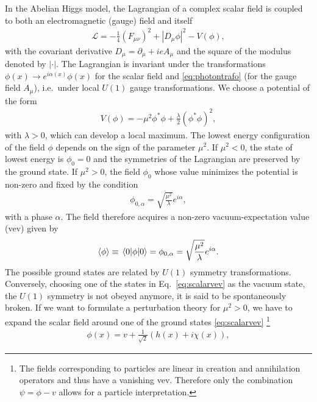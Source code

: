 In the Abelian Higgs model, the Lagrangian of a complex scalar field is coupled to both an electromagnetic (gauge) field and itself 
\begin{align}\label{eq:sclag}
  \mathcal{L} = -\frac{1}{4}(F_{\mu\nu})^2+|D_\mu \phi|^2 - V(\phi),
\end{align}
with the covariant derivative $D_\mu = \partial_\mu + i e A_\mu$ and
the square of the modulus denoted by $|\cdot|$. The
Lagrangian is invariant under the transformations $\phi(x) \rightarrow
e^{i\alpha(x)} \phi(x)$ for the scalar field and
\eqref{eq:photontrafo} (for the gauge field $A_\mu$), i.e.~under local $U(1)$ gauge
transformations. We choose a potential of the form 
\begin{align}\label{eq:scpot}
  V(\phi) = -\mu^2\phi^*\phi+\frac{\lambda}{2}(\phi^*\phi)^2,
\end{align}
with $\lambda >0$, which can develop a
local maximum. The lowest energy configuration of the field $\phi$ depends on the
sign of the parameter $\mu^2$. If $\mu^2<0$, the state of lowest energy is $\phi_0=0$
and the symmetries of the Lagrangian are preserved by the ground state. 
If $\mu^2>0$, the field $\phi_0$ whose value
minimizes the potential is non-zero and fixed by the condition
\begin{align}\label{eq:alphah}
  \phi_{0,\alpha} = \sqrt{\frac{\mu^2}{\lambda}}e^{i\alpha},
\end{align}
with a phase $\alpha$. The field therefore acquires a non-zero vacuum-expectation value
(vev) given by
\begin{align}\label{eq:scalarvev}
  \expval{\phi}\equiv\expval{\phi}{0} = \phi_{0,\alpha} = \sqrt{\frac{\mu^2}{\lambda}}e^{i\alpha}.
\end{align}
The possible ground states are related by $U(1)$ symmetry
transformations. Conversely, choosing one of the states in Eq.~\eqref{eq:scalarvev}
as the vacuum state, the $U(1)$ symmetry is not obeyed anymore, it is said to be spontaneously
broken. If we want to formulate a perturbation theory for $\mu^2>0$,
we have to expand the scalar field around one of the ground states
\eqref{eq:scalarvev} \footnote{The fields corresponding to particles
  are linear in
  creation and annihilation operators and thus have a vanishing vev. Therefore
  only the combination $\psi = \phi-v$ allows for a particle interpretation.}
\begin{align}
  \phi(x) = v + \frac{1}{\sqrt{2}}\left(h(x)+i\chi(x)\right),
\end{align}
